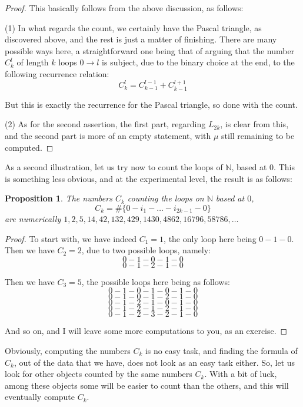 \documentclass[12pt]{amsbook}
\newtheorem{proposition}[theorem]{Proposition}
\begin{document}
\begin{proof}
This basically follows from the above discussion, as follows:

\medskip

(1) In what regards the count, we certainly have the Pascal triangle, as discovered above, and the rest is just a matter of finishing. There are many possible ways here, a straightforward one being that of arguing that the number $C_k^l$ of length $k$ loops $0\to l$  is subject, due to the binary choice at the end, to the following recurrence relation:
$$C_k^l=C_{k-1}^{l-1}+C_{k-1}^{l+1}$$

But this is exactly the recurrence for the Pascal triangle, so done with the count. 

\medskip

(2) As for the second assertion, the first part, regarding $L_{2k}$, is clear from this, and the second part is more of an empty statement, with $\mu$ still remaining to be computed.
\end{proof}

As a second illustration, let us try now to count the loops of $\mathbb N$, based at 0. This is something less obvious, and at the experimental level, the result is as follows:


\begin{proposition}
The numbers $C_k$ counting the loops on $\mathbb N$ based at $0$,
$$C_k=\#\Big\{0-i_1-\ldots-i_{2k-1}-0\Big\}$$
are numerically $1,2,5,14,42,132,429,1430,4862,16796,58786,\ldots$
\end{proposition}

\begin{proof}
To start with, we have indeed $C_1=1$, the only loop here being $0-1-0$. Then we have $C_2=2$, due to two possible loops, namely:
$$0-1-0-1-0$$
$$0-1-2-1-0$$

Then we have $C_3=5$, the possible loops here being as follows:
$$0-1-0-1-0-1-0$$
$$0-1-0-1-2-1-0$$
$$0-1-2-1-0-1-0$$
$$0-1-2-1-2-1-0$$
$$0-1-2-3-2-1-0$$

And so on, and I will leave some more computations to you, as an exercise.
\end{proof}

Obviously, computing the numbers $C_k$ is no easy task, and finding the formula of $C_k$, out of the data that we have, does not look as an easy task either. So, let us look for other objects counted by the same numbers $C_k$. With a bit of luck, among these objects some will be easier to count than the others, and this will eventually compute $C_k$.
\end{document}
